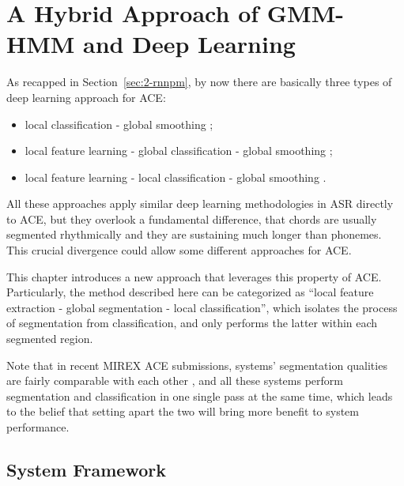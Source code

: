 
\chapter{A Hybrid Approach of GMM-HMM and Deep Learning}\label{cp:ghmm} %


As recapped in Section~\ref{sec:2-rnnpm}, by now there are basically three types of deep learning approach for ACE:
\begin{itemize}
\item local classification - global smoothing \cite{humphrey2012rethinking};
\item local feature learning - global classification - global smoothing \cite{boulanger2013audio,sigtia2015audio};
\item local feature learning - local classification - global smoothing \cite{zhou2015chord}.
\end{itemize}
All these approaches apply similar deep learning methodologies in ASR \cite{deng2014deep,bourlard2012connectionist} directly to ACE, but they overlook a fundamental difference, that chords are usually segmented rhythmically and they are sustaining much longer than phonemes. This crucial divergence could allow some different approaches for ACE.

This chapter introduces a new approach that leverages this property of ACE. Particularly, the method described here can be categorized as ``local feature extraction - global segmentation - local classification'', which isolates the process of segmentation from classification, and only performs the latter within each segmented region.

Note that in recent MIREX ACE submissions, systems' segmentation qualities are fairly comparable with each other \cite{burgoyne2014comparative}, and all these systems perform segmentation and classification in one single pass at the same time, which leads to the belief that setting apart the two will bring more benefit to system performance.


\section{System Framework} \label{sec:3-sysframe}

